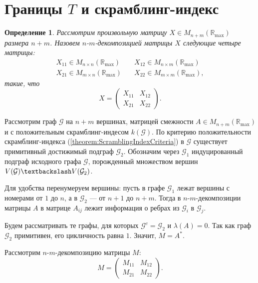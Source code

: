 \documentclass[12pt]{article}
\newtheorem{definition}[theorem]{Определение}
\begin{document}
\section{Границы $T$ и скрамблинг-индекс}
\begin{definition}
Рассмотрим произвольную матрицу $X \in M_{n+m}(\mathbb{R}_{\max})$ размера $n + m$. Назовем $n$-$m$-декомпозицией матрицы $X$ следующие четыре матрицы:\begin{align*}
X_{11} \in M_{n \times n}(\mathbb{R}_{\max}) & \quad X_{12} \in M_{n \times m}(\mathbb{R}_{\max}) \\
X_{21} \in M_{m \times n}(\mathbb{R}_{\max}) & \quad X_{22} \in M_{m \times m}(\mathbb{R}_{\max}),
\end{align*}
такие, что \begin{equation*}
X = \begin{pmatrix}
X_{11} & X_{12} \\
X_{21} & X_{22}
\end{pmatrix}.
\end{equation*}
\end{definition}

Рассмотрим граф $\mathcal{G}$ на $n + m$ вершинах, матрицей смежности $A \in M_{n+m}(\mathbb{R}_{\max})$ и с положительным скрамблинг-индесом $k(\mathcal{G})$. По критерию положительности скрамблинг-индекса (\ref{theorem:ScramblingIndexCriteria}) в $\mathcal{G}$ существует примитивный достижимый подграф $\mathcal{G}_2$.  Обозначим через $\mathcal{G}_1$ индуцированный подграф исходного графа $\mathcal{G}$, порожденный множеством вершин $V(\mathcal{G}) \textbackslash V(\mathcal{G}_2)$.

Для удобства перенумеруем вершины: пусть в графе $\mathcal{G}_1$ лежат вершины с номерами от $1$ до $n$, а в $\mathcal{G}_2$ --- от $n + 1$ до $n + m$. Тогда в $n$-$m$-декомпозиции матрицы $A$ в матрице $A_{ij}$ лежит информация о ребрах из $\mathcal{G}_i$ в $\mathcal{G}_j$.

Будем рассматривать те графы, для которых $\mathcal{G}^c = \mathcal{G}_2$ и $\lambda(A) = 0$. Так как граф $\mathcal{G}_2$ примитивен, его цикличность равна $1$. Значит, $M = A^*$.

Рассмотрим $n$-$m$-декомпозицию матрицы $M$:
\begin{equation*}
M = \begin{pmatrix}
M_{11} & M_{12}\\
M_{21} & M_{22}
\end{pmatrix}.
\end{equation*}
\end{document}
